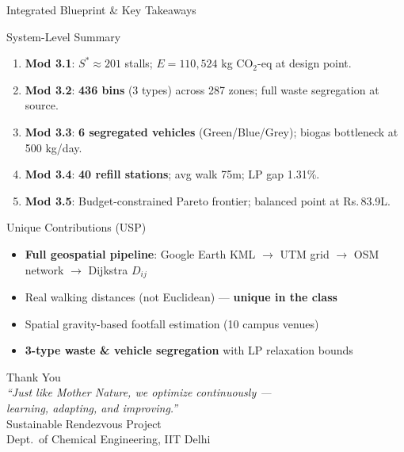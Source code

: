 \documentclass[aspectratio=169]{beamer}
\begin{document}
\begin{frame}{Integrated Blueprint \& Key Takeaways}
    \begin{block}{System-Level Summary}
        \begin{enumerate}
            \item \textbf{Mod 3.1}: $S^* \approx 201$ stalls; $E = 110{,}524$ kg CO$_2$-eq at design point.
            \item \textbf{Mod 3.2}: \textbf{436 bins} (3 types) across 287 zones; full waste segregation at source.
            \item \textbf{Mod 3.3}: \textbf{6 segregated vehicles} (Green/Blue/Grey); biogas bottleneck at 500 kg/day.
            \item \textbf{Mod 3.4}: \textbf{40 refill stations}; avg walk 75m; LP gap 1.31\%.
            \item \textbf{Mod 3.5}: Budget-constrained Pareto frontier; balanced point at Rs.\,83.9L.
        \end{enumerate}
    \end{block}

    \begin{exampleblock}{Unique Contributions (USP)}
        \begin{itemize}
            \item \textbf{Full geospatial pipeline}: Google Earth KML $\to$ UTM grid $\to$ OSM network $\to$ Dijkstra $D_{ij}$
            \item Real walking distances (not Euclidean) --- \textbf{unique in the class}
            \item Spatial gravity-based footfall estimation (10 campus venues)
            \item \textbf{3-type waste \& vehicle segregation} with LP relaxation bounds
        \end{itemize}
    \end{exampleblock}
\end{frame}

\begin{frame}[plain]
    \vfill
    \begin{center}
        {\Huge \textcolor{DarkNavy}{Thank You}} \\
        \vspace{0.8cm}
        {\large \textit{``Just like Mother Nature, we optimize continuously ---}}\\
        {\large \textit{learning, adapting, and improving.''}}\\
        \vspace{0.8cm}
        \small Sustainable Rendezvous Project \\
        \small Dept.\ of Chemical Engineering, IIT Delhi
    \end{center}
    \vfill
\end{frame}
\end{document}
